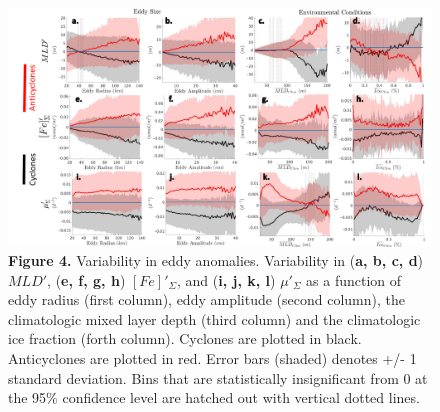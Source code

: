\documentclass{article}
\begin{document}

\begin{figure}[!htbp]
 \begin{adjustwidth}{-1.5in}{-1.2in}
 \centering
 \includegraphics[scale=.60]{Fig8.pdf}
 \end{adjustwidth}
\caption[Variability in eddy anomalies]
{\textbf{Figure 4.} Variability in eddy anomalies. Variability in (\textbf{a, b, c, d}) $MLD'$,  (\textbf{e, f, g, h}) $[Fe]'_\Sigma$, and (\textbf{i, j, k, l}) $\mu'_\Sigma$ as a function of eddy radius (first column), eddy amplitude (second column), the climatologic mixed layer depth (third column) and the climatologic ice fraction (forth column). Cyclones are plotted in black. Anticyclones are plotted in red. Error bars (shaded) denotes +/- 1 standard deviation. Bins that are statistically insignificant from 0 at the 95\% confidence level are hatched out with vertical dotted lines.
}
\label{fig:Fig4}
\end{figure}



\end{document}
